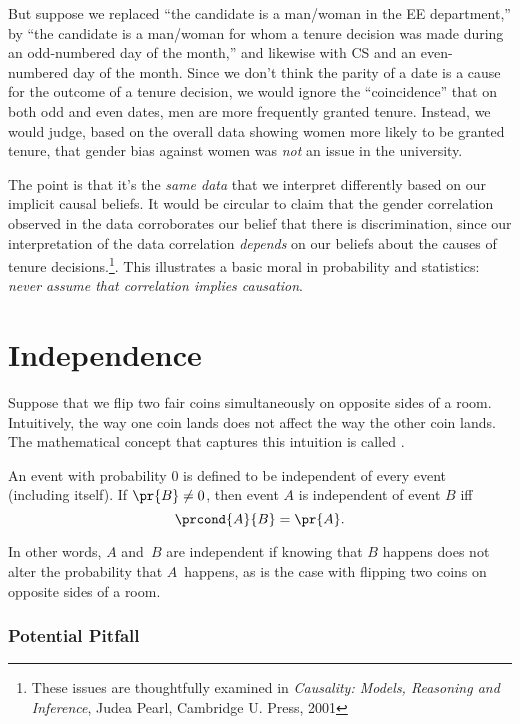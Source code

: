 But suppose we replaced ``the candidate is a man/woman in the EE
department,'' by ``the candidate is a man/woman for whom a tenure
decision was made during an odd-numbered day of the month,'' and
likewise with CS and an even-numbered day of the month.  Since we
don't think the parity of a date is a cause for the outcome of a
tenure decision, we would ignore the ``coincidence'' that on both odd
and even dates, men are more frequently granted tenure.  Instead, we
would judge, based on the overall data showing women more likely to be
granted tenure, that gender bias against women was \emph{not} an issue
in the university.

The point is that it's the \emph{same data} that we interpret
differently based on our implicit causal beliefs.  It would be
circular to claim that the gender correlation observed in the data
corroborates our belief that there is discrimination, since our
interpretation of the data correlation \emph{depends} on our beliefs
about the causes of tenure decisions.\footnote{These issues are
  thoughtfully examined in \emph{Causality: Models, Reasoning and
    Inference}, Judea Pearl, Cambridge U. Press, 2001}.  This
illustrates a basic moral in probability and statistics: \emph{never
  assume that correlation implies causation}.

\section{Independence}
Suppose that we flip two fair coins simultaneously on opposite sides
of a room.  Intuitively, the way one coin lands does not affect the
way the other coin lands.  The mathematical concept that captures
this intuition is called .
\begin{definition}\label{def:independence}
An event with probability 0 is defined to be independent of every
event (including itself).  If $\pr{B} \neq 0$, then
event $A$ is independent of event $B$ iff
\begin{equation}\label{eqn:independence}
    \prcond{A}{B} = \pr{A}.
\end{equation}
\end{definition}
In other words, $A$ and~$B$ are independent if knowing that $B$
happens does not alter the probability that $A$~happens, as is the
case with flipping two coins on opposite sides of a room.

\subsubsection{Potential Pitfall}


